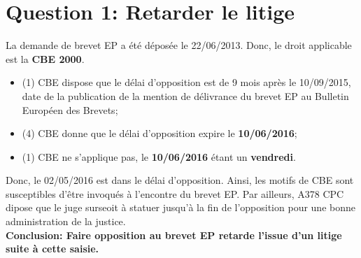 \section{Question 1: Retarder le litige}

La demande de brevet EP a été déposée le 22/06/2013.
Donc, le droit applicable est la \textbf{CBE 2000}.

\begin{itemize}
  \item {}(1) CBE dispose que le délai d'opposition est de 
  9 mois après le 10/09/2015, 
  date de la publication de la mention de délivrance
  du brevet EP au Bulletin Européen des Brevets;
  
  \item {}(4) CBE donne que le délai d'opposition 
  expire le \textbf{10/06/2016};

  \item {}(1) CBE ne s'applique pas, le \textbf{10/06/2016}
  étant un \textbf{vendredi}.\\
\end{itemize}

Donc, le 02/05/2016 est dans le délai d'opposition.
Ainsi, les motifs de  CBE sont susceptibles
d'être invoqués à l'encontre du brevet EP. Par ailleurs,
A378 CPC dipose que le juge surseoit à statuer jusqu'à
la fin de l'opposition pour une bonne administration de
la justice.\\

\textbf{Conclusion: Faire opposition au brevet EP retarde l'issue
d'un litige suite à cette saisie.}